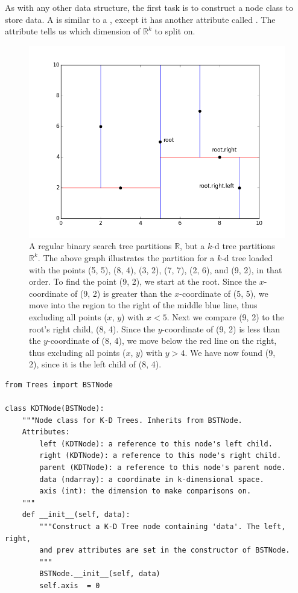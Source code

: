 As with any other data structure, the first task is to construct a node class to store data.
A  is similar to a , except it has another attribute called .
The  attribute tells us which dimension of $\mathbb{R}^k$ to split on.

\begin{figure}[H]
\includegraphics[width=\textwidth]{kdpic1.png}
\caption{A regular binary search tree partitions $\mathbb{R}$, but a $k$-d tree partitions $\mathbb{R}^{k}$. The above graph illustrates the partition for a $k$-d tree loaded with the points (5, 5), (8, 4), (3, 2), (7, 7), (2, 6), and (9, 2), in that order. To find the point (9, 2), we start at the root. Since the $x$-coordinate of (9, 2) is greater than the $x$-coordinate of (5, 5), we move into the region to the right of the middle blue line, thus excluding all points ($x$, $y$) with $x < 5$. Next we compare (9, 2) to the root's right child, (8, 4). Since the $y$-coordinate of (9, 2) is less than the $y$-coordinate of (8, 4), we move below the red line on the right, thus excluding all points ($x$, $y$) with $y > 4$. We have now found (9, 2), since it is the left child of (8, 4).}
\label{fig:k-binary-search}
\end{figure}

\begin{lstlisting}
from Trees import BSTNode

class KDTNode(BSTNode):
    """Node class for K-D Trees. Inherits from BSTNode.
    Attributes:
        left (KDTNode): a reference to this node's left child.
        right (KDTNode): a reference to this node's right child.
        parent (KDTNode): a reference to this node's parent node.
        data (ndarray): a coordinate in k-dimensional space.
        axis (int): the dimension to make comparisons on.
    """
    def __init__(self, data):
        """Construct a K-D Tree node containing 'data'. The left, right,
        and prev attributes are set in the constructor of BSTNode.
        """
        BSTNode.__init__(self, data)
        self.axis  = 0
\end{lstlisting}

